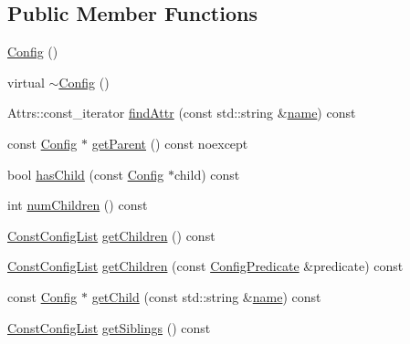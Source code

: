\subsection*{Public Member Functions}
\begin{DoxyCompactItemize}
\item 
\hyperlink{classtheoria_1_1config_1_1Config_abd0c571c116924871e30444b192b792a}{Config} ()
\item 
virtual \hyperlink{classtheoria_1_1config_1_1Config_a543dce59b66475c5108088ee4ce1cdfc}{$\sim$\+Config} ()
\item 
Attrs\+::const\+\_\+iterator \hyperlink{classtheoria_1_1config_1_1Config_a633738ea60f5d4d0d244bc7d05c9d17f}{find\+Attr} (const std\+::string \&\hyperlink{classtheoria_1_1config_1_1Config_af4929f1c9b86576fdc439051a10f89cd}{name}) const
\item 
const \hyperlink{classtheoria_1_1config_1_1Config}{Config} $\ast$ \hyperlink{classtheoria_1_1config_1_1Config_ac30090b5eedf4126046d7ace48b5fa40}{get\+Parent} () const noexcept
\item 
bool \hyperlink{classtheoria_1_1config_1_1Config_ad9a5e883dc4918b1b9d00c1a53979149}{has\+Child} (const \hyperlink{classtheoria_1_1config_1_1Config}{Config} $\ast$child) const
\item 
int \hyperlink{classtheoria_1_1config_1_1Config_ad67efbe126c02048be83ebb40f7d7bce}{num\+Children} () const
\item 
\hyperlink{classtheoria_1_1config_1_1Config_a61230728ffa4d92667a536c8c0f0ca30}{Const\+Config\+List} \hyperlink{classtheoria_1_1config_1_1Config_ab258c41faac01f6dda0ff0c86adc9903}{get\+Children} () const
\item 
\hyperlink{classtheoria_1_1config_1_1Config_a61230728ffa4d92667a536c8c0f0ca30}{Const\+Config\+List} \hyperlink{classtheoria_1_1config_1_1Config_a6433b53d322bd5bc78f67c8a8d9f2700}{get\+Children} (const \hyperlink{classtheoria_1_1config_1_1Config_a293ebfd7146d935e232a066f7e6fa279}{Config\+Predicate} \&predicate) const
\item 
const \hyperlink{classtheoria_1_1config_1_1Config}{Config} $\ast$ \hyperlink{classtheoria_1_1config_1_1Config_af8e4621be24f1860b1fed707628db7e9}{get\+Child} (const std\+::string \&\hyperlink{classtheoria_1_1config_1_1Config_af4929f1c9b86576fdc439051a10f89cd}{name}) const
\item 
\hyperlink{classtheoria_1_1config_1_1Config_a61230728ffa4d92667a536c8c0f0ca30}{Const\+Config\+List} \hyperlink{classtheoria_1_1config_1_1Config_afe6803a6e3e6600ab4ce33a7417ffaa9}{get\+Siblings} () const

\end{DoxyCompactItemize}
